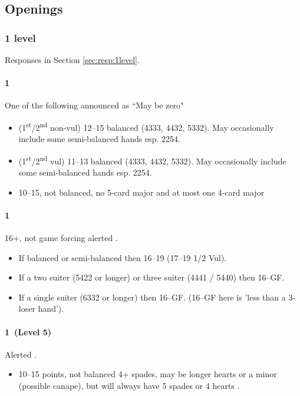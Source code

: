 
\subsection{Openings}
\label{sec:openings}

\subsubsection{1 level}
\label{sec:open:1level}

Responses in Section \ref{sec:resp:1level}.

\paragraph{1\clubs}

One of the following  announced as ``May be zero" 

\begin{itemize}
\item (1\textsuperscript{st}/2\textsuperscript{nd} non-vul) 12--15 balanced (4333, 4432, 5332). May occasionally include some semi-balanced hands esp. 2254.
\item (1\textsuperscript{st}/2\textsuperscript{nd} vul) 11--13 balanced (4333, 4432, 5332). May occasionally include some semi-balanced hands esp. 2254.

\item 10--15, not balanced, no 5-card major and at most one 4-card major
\end{itemize}

\paragraph{1\diamonds}

16+, not game forcing  alerted . 
\begin{itemize}
\item If balanced or semi-balanced then 16--19 (17--19 1/2 Vul). 
\item If a two suiter (5422 or longer) or three suiter (4441 / 5440) then 16--GF. 
\item If a single suiter (6332 or longer) then 16--GF. (16--GF here is 'less than a 3-loser hand').
\end{itemize}

{\it

\paragraph{1\hearts~(Level 5)}

Alerted .

\begin{itemize}
\item 10--15 points, not balanced 4+ spades, may be longer hearts or a minor (possible canape), but will always have 5 spades or 4 hearts .
\end{itemize}

}


